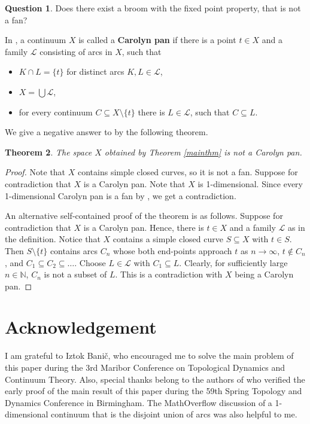 \documentclass[12pt]{article}
\newtheorem{theorem}{Theorem} %
\theoremstyle{definition}
\newtheorem{question}[theorem]{Question}
\theoremstyle{remark}
\begin{document}
\begin{question}
Does there exist a broom with the fixed point property, that is not a fan?
\end{question}


In \cite{phans}, a continuum $X$ is called a \textbf{Carolyn pan} if there is a point $t\in X$ and a family $\mathcal L$ consisting of arcs in $X$, such that 
\begin{itemize}[noitemsep]
    \item $K\cap L=\{t\}$ for distinct arcs $K, L\in\mathcal L$,
    \item $X=\bigcup \mathcal L$,
    \item for every continuum $C\subseteq X\setminus \{t\}$ there is $L\in\mathcal L$, such that $C\subseteq L$.
\end{itemize}

We give a negative answer to \cite[Problem 4.17]{phans} by the following theorem.

\begin{theorem} \label{theoremanotherproblem}
The space $X$ obtained by Theorem \ref{mainthm} is not a Carolyn pan.
\end{theorem}

\begin{proof}
Note that $X$ contains simple closed curves, so it is not a fan.
Suppose for contradiction that $X$ is a Carolyn pan.
Note that $X$ is 1-dimensional.
Since every 1-dimensional Carolyn pan is a fan by \cite[Theorem 4.15]{phans}, we get a contradiction.

An alternative self-contained proof of the theorem is as follows.
Suppose for contradiction that $X$ is a Carolyn pan. Hence, there is $t\in X$ and a family $\mathcal L$ as in the definition. 
Notice that $X$ contains a simple closed curve $S\subseteq X$ with $t\in S$. 
Then $S\setminus \{t\}$ contains arcs $C_n$ whose both end-points approach $t$ as $n\to\infty$, $t\notin C_n$, and $C_1\subseteq C_2\subseteq \dots$.
Choose $L\in\mathcal L$ with $C_1\subseteq L$. Clearly, for sufficiently large $n\in\mathbb N$, $C_n$ is not a subset of $L$. This is a contradiction with $X$ being a Carolyn pan.
\end{proof}
 



\section*{Acknowledgement}
I am grateful to Iztok Bani\v{c}, who encouraged me to solve the main problem of this paper during the 3rd Maribor Conference on
Topological Dynamics and Continuum Theory.
Also, special thanks belong to the authors of \cite{phans} who verified the early proof of the main result of this paper during the 59th Spring Topology and Dynamics Conference in Birmingham.
The MathOverflow discussion of a 1-dimensional continuum that is the disjoint union of arcs \cite{Mathoverflow} was also helpful to me.


\end{document}
